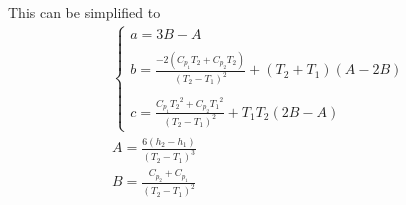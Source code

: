 \documentclass{article}   	%
\begin{document}
This can be simplified to
\begin{gather}
  \begin{cases}
    a=3B - A \\ \\
    b=\frac{-2(C_{p_1} T_2 + C_{p_2}T_2)}{(T_2 - T_1)^2} +(T_2+T_1) (A - 2B) \\ \\
    c=\frac{C_{p_1} {T_2}^2 + C_{p_2} {T_1}^2}{(T_2-T_1)^2} + T_1 T_2 (2B - A)
  \end{cases} \\
  A = \frac{6(h_2 - h_1)}{(T_2 - T_1)^3} \\
  B = \frac{C_{p_2} + C_{p_1}}{(T_2 - T_1)^2}
\end{gather}
\end{document}
